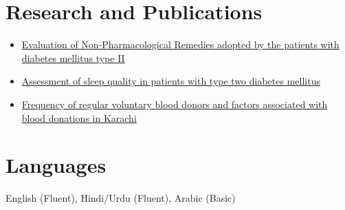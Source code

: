 \documentclass[a4paper,11pt]{article}
\begin{document}
\section*{Research and Publications}
\vspace{-0.6em}
\begin{itemize}[leftmargin=*]
    \item \href{https://www.pafmj.org/index.php/PAFMJ/article/view/4700}{Evaluation of Non-Pharmacological Remedies adopted by the patients with diabetes mellitus type II}
    \item \href{https://www.pafmj.org/index.php/PAFMJ/article/view/4585}{Assessment of sleep quality in patients with type two diabetes mellitus}
    \item \href{https://pjmd.zu.edu.pk/volume-9-issue-2/volume-9-issue-2-2020}{Frequency of regular voluntary blood donors and factors associated with blood donations in Karachi}
\end{itemize}


\section*{Languages}
\vspace{-0.6em}








English (Fluent), Hindi/Urdu (Fluent), Arabic (Basic)
\end{document}

